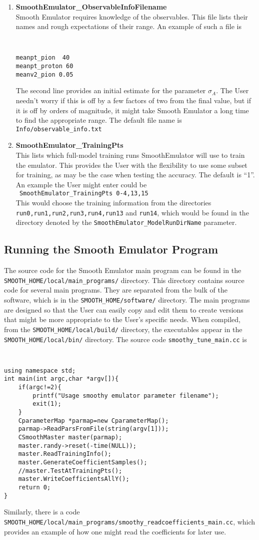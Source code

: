 \documentclass[main.tex]{subfiles}
\begin{document}
\begin{enumerate}
\item {\bf SmoothEmulator\_ObservableInfoFilename}\\
Smooth Emulator requires knowledge of the observables. This file lists their names and rough expectations of their range. An example of such a file is
{\tt
\begin{verbatim}
meanpt_pion  40
meanpt_proton 60
meanv2_pion 0.05
\end{verbatim}
}
The second line provides an initial estimate for the parameter $\sigma_A$. The User needn't worry if this is off by a few factors of two from the final value, but if it is off by orders of magnitude, it might take Smooth Emulator a long time to find the appropriate range. The default file name is {\tt Info/observable\_info.txt}
\item {\bf SmoothEmulator\_TrainingPts}\\
This lists which full-model training runs SmoothEmulator will use to train the emulator. This provides the User with the flexibility to use some subset for training, as may be the case when testing the accuracy. The default is ``1''. An example the User might enter could be\\
{\tt ~SmoothEmulator\_TrainingPts  0-4,13,15}\\
This would choose the training information from the directories {\tt run0,run1,run2,run3,run4,run13} and {\tt run14}, which would be found in the directory denoted by the {\tt SmoothEmulator\_ModelRunDirName} parameter.
\end{enumerate}

\subsection{Running the Smooth Emulator Program}

The source code for the Smooth Emulator main program can be found in the {\tt SMOOTH\_HOME/local/main\_programs/} directory. This directory contains source code for several main programs. They are separated from the bulk of the software, which is in the {\tt SMOOTH\_HOME/software/} directory. The main programs are designed so that the User can easily copy and edit them to create versions that might be more appropriate to the User's specific needs. When compiled, from the {\tt SMOOTH\_HOME/local/build/} directory, the executables appear in the {\tt SMOOTH\_HOME/local/bin/} directory. The source code {\tt smoothy\_tune\_main.cc} is
{\tt
\begin{verbatim}
using namespace std;
int main(int argc,char *argv[]){
    if(argc!=2){
        printf("Usage smoothy emulator parameter filename");
        exit(1);
    }
    CparameterMap *parmap=new CparameterMap();
    parmap->ReadParsFromFile(string(argv[1]));
    CSmoothMaster master(parmap);
    master.randy->reset(-time(NULL));
    master.ReadTrainingInfo();
    master.GenerateCoefficientSamples();
    //master.TestAtTrainingPts();
    master.WriteCoefficientsAllY();
    return 0;
}
\end{verbatim}
}
Similarly, there is a code {\tt SMOOTH\_HOME/local/main\_programs/smoothy\_readcoefficients\_main.cc}, which provides an example of how one might read the coefficients for later use.
\end{document}
